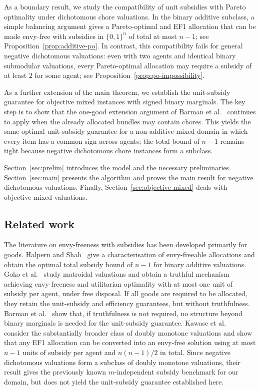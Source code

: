 \documentclass[sigconf,anonymous]{aamas}
\theoremstyle{acmplain}
\theoremstyle{acmdefinition}
\theoremstyle{acmplain}
\begin{document}
As a boundary result, we study the compatibility of unit subsidies with Pareto optimality under dichotomous chore valuations. In the binary additive subclass, a simple balancing argument gives a Pareto-optimal and EF1 allocation that can be made envy-free with subsidies in \(\{0,1\}^n\) of total at most \(n-1\); see Proposition~\ref{prop:additive-po}. In contrast, this compatibility fails for general negative dichotomous valuations: even with two agents and identical binary submodular valuations, every Pareto-optimal allocation may require a subsidy of at least \(2\) for some agent; see Proposition~\ref{prop:po-impossibility}.

As a further extension of the main theorem, we establish the unit-subsidy guarantee for objective mixed instances with signed binary marginals. The key step is to show that the one-good extension argument of Barman et al.~\cite{BKNS22} continues to apply when the already allocated bundles may contain chores. This yields the same optimal unit-subsidy guarantee for a non-additive mixed domain in which every item has a common sign across agents; the total bound of \(n-1\) remains tight because negative dichotomous chore instances form a subclass.

Section~\ref{sec:prelim} introduces the model and the necessary preliminaries. Section~\ref{sec:main} presents the algorithm and proves the main result for negative dichotomous valuations. Finally, Section~\ref{sec:objective-mixed} deals with objective mixed valuations.


\subsection{Related work}

The literature on envy-freeness with subsidies has been developed primarily for goods. Halpern and Shah~\cite{HS19} give a characterisation of envy-freeable allocations and obtain the optimal total subsidy bound of $n-1$ for binary additive valuations. Goko et al.~\cite{goko2024fair} study matroidal valuations and obtain a truthful mechanism achieving envy-freeness and utilitarian optimality with at most one unit of subsidy per agent, under free disposal. If all goods are required to be allocated, they retain the unit-subsidy and efficiency guarantees, but without truthfulness. Barman et al.~\cite{BKNS22} show that, if truthfulness is not required, no structure beyond binary marginals is needed for the unit-subsidy guarantee. Kawase et al.~\cite{kawase2025towards} consider the substantially broader class of doubly monotone valuations and show that any EF1 allocation can be converted into an envy-free solution using at most $n-1$ units of subsidy per agent and $n(n-1)/2$ in total. Since negative dichotomous valuations form a subclass of doubly monotone valuations, their result gives the previously known $m$-independent subsidy benchmark for our domain, but does not yield the unit-subsidy guarantee established here.
\end{document}

